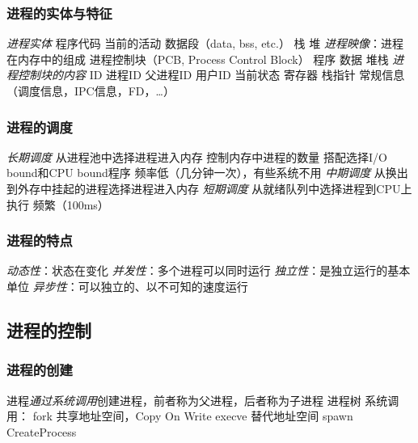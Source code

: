 \documentclass{ctexart}
\begin{document}
\begin{itemize}
{\begin{minipage}{.5\textwidth}
\begin{center}
            \end{center}
        \end{minipage}
    }
\end{itemize}
\subsubsection{进程的实体与特征}
\begin{outline}
    \1 \emph{进程实体}
        \2 程序代码
        \2 当前的活动
        \2 数据段（data, bss, etc.）
        \2 栈
        \2 堆
    \1 \emph{进程映像}：进程在内存中的组成
        \2 进程控制块（PCB, Process Control Block）
        \2 程序
        \2 数据
        \2 堆栈
    \1 \emph{进程控制块的内容}
        \2 ID
            \3 进程ID
            \3 父进程ID
            \3 用户ID
        \2 当前状态
            \3 寄存器
            \3 栈指针
        \2 常规信息（调度信息，IPC信息，FD，\dots）
\end{outline}
\subsubsection{进程的调度}
\begin{outline}
    \1 \emph{长期调度}
        \2 从进程池中选择进程进入内存
            \3 控制内存中进程的数量
        \2 搭配选择I/O bound和CPU bound程序
        \2 频率低（几分钟一次），有些系统不用
    \1 \emph{中期调度}
        \2 从换出到外存中挂起的进程选择进程进入内存
    \1 \emph{短期调度}
        \2 从就绪队列中选择进程到CPU上执行
        \2 频繁（100ms）
\end{outline}
\subsubsection{进程的特点}
\begin{outline}
    \1 \emph{动态性}：状态在变化
    \1 \emph{并发性}：多个进程可以同时运行
    \1 \emph{独立性}：是独立运行的基本单位
    \1 \emph{异步性}：可以独立的、以不可知的速度运行
\end{outline}

\subsection{
    进程的控制
}
\subsubsection{进程的创建}
\begin{outline}
    \1 进程\emph{通过系统调用}创建进程，前者称为父进程，后者称为子进程
        \2 进程树
    \1 系统调用：
        \2 fork
            \3 共享地址空间，Copy On Write
        \2 execve
            \3 替代地址空间
        \2 spawn
        \2 CreateProcess
\end{outline}
\end{document}
